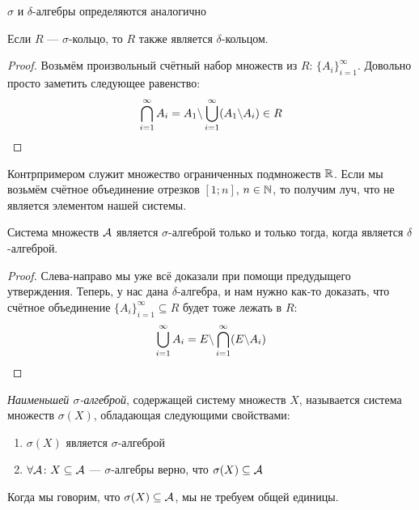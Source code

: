 \begin{note}
	$\sigma$ и $\delta$-алгебры определяются аналогично
\end{note}

\begin{proposition}
	Если $R$ --- $\sigma$-кольцо, то $R$ также является $\delta$-кольцом.
\end{proposition}

\begin{proof}
	Возьмём произвольный счётный набор множеств из $R$: $\{A_i\}_{i = 1}^\infty$. Довольно просто заметить следующее равенство:
	\[
		\bigcap_{i = 1}^\infty A_i = A_1 \backslash \bigcup_{i = 1}^\infty (A_1 \backslash A_i) \in R
	\]
\end{proof}

\begin{note}
	Контрпримером служит множество ограниченных подмножеств $\mathbb{R}$. Если мы возьмём счётное объединение отрезков $[1; n]$, $n \in \mathbb{N}$, то получим луч, что не является элементом нашей системы.
\end{note}

\begin{proposition}
	Система множеств $\mathcal{A}$ является $\sigma$-алгеброй только и только тогда, когда является $\delta$-алгеброй.
\end{proposition}

\begin{proof}
	Слева-направо мы уже всё доказали при помощи предудыщего утверждения. Теперь, у нас дана $\delta$-алгебра, и нам нужно как-то доказать, что счётное объединение $\{A_i\}_{i = 1}^\infty \subseteq R$ будет тоже лежать в $R$:
	\[
		\bigcup_{i = 1}^\infty A_i = E \backslash \bigcap_{i = 1}^\infty (E \backslash A_i)
	\]
\end{proof}

\begin{definition}
	\textit{Наименьшей $\sigma$-алгеброй}, содержащей систему множеств $X$, называется система множеств $\sigma(X)$, обладающая следующими свойствами:
	\begin{enumerate}
		\item $\sigma(X)$ является $\sigma$-алгеброй
		
		\item $\forall \mathcal{A} \colon X \subseteq \mathcal{A}$ --- $\sigma$-алгебры верно, что $\sigma(X) \subseteq \mathcal{A}$
	\end{enumerate}
\end{definition}

\begin{note}
	Когда мы говорим, что $\sigma(X) \subseteq \mathcal{A}$, мы не требуем общей единицы.
\end{note}

